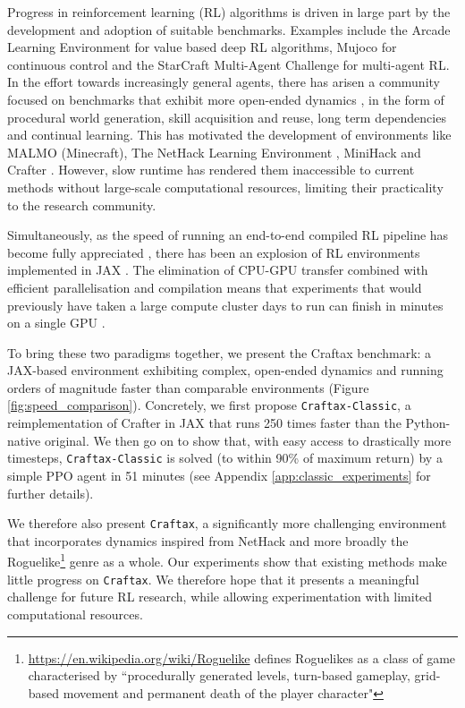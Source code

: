 \documentclass{article}
\theoremstyle{plain}
\theoremstyle{definition}
\theoremstyle{remark}
\begin{document}
% 
Progress in reinforcement learning (RL) algorithms is driven in large part by the development and adoption of suitable benchmarks.  Examples include the Arcade Learning Environment \citep{bellemare2013arcade} for value based deep RL algorithms, Mujoco \citep{todorov2012mujoco} for continuous control and the StarCraft Multi-Agent Challenge \citep{samvelyan2019starcraft} for multi-agent RL.  In the effort towards increasingly general agents, there has arisen a community focused on benchmarks that exhibit more open-ended dynamics \citep{stanley2017open}, in the form of procedural world generation, skill acquisition and reuse, long term dependencies and continual learning.  This has motivated the development of environments like MALMO \citep{johnson2016malmo} (Minecraft), The NetHack Learning Environment \citep{nle2020kuttler}, MiniHack \citep{minihack2021samvelyan} and Crafter \citep{hafner2021benchmarking}.  However, slow runtime has rendered them inaccessible to current methods without large-scale computational resources, limiting their practicality to the research community.

Simultaneously, as the speed of running an end-to-end compiled RL pipeline has become fully appreciated \citep{lu2022discovered}, there has been an explosion of RL environments implemented in JAX \citep{brax2021freeman, gymnax2022github, bonnet2023jumanji, flair2023jaxmarl, nikulin2023xlandminigrid, koyamada2023pgx}.  The elimination of CPU-GPU transfer combined with efficient parallelisation and compilation means that experiments that would previously have taken a large compute cluster days to run can finish in minutes on a single GPU \citep{lu2022discovered}.

To bring these two paradigms together, we present the Craftax benchmark: a JAX-based environment exhibiting complex, open-ended dynamics and running orders of magnitude faster than comparable environments (Figure \ref{fig:speed_comparison}).  Concretely, we first propose \texttt{Craftax-Classic}, a reimplementation of Crafter \citep{hafner2021benchmarking} in JAX that runs 250 times faster than the Python-native original.  We then go on to show that, with easy access to drastically more timesteps, \texttt{Craftax-Classic} is solved (to within 90\% of maximum return) by a simple PPO \citep{schulman2017proximal} agent in 51 minutes (see Appendix \ref{app:classic_experiments} for further details).

We therefore also present \texttt{Craftax}, a significantly more challenging environment that incorporates dynamics inspired from NetHack \citep{nle2020kuttler} and more broadly the Roguelike\footnote{\url{https://en.wikipedia.org/wiki/Roguelike} defines Roguelikes as a class of game characterised by ``procedurally generated levels, turn-based gameplay, grid-based movement and permanent death of the player character"} genre as a whole.  Our experiments show that existing methods make little progress on \texttt{Craftax}.  We therefore hope that it presents a meaningful challenge for future RL research, while allowing experimentation with limited computational resources.
\end{document}
